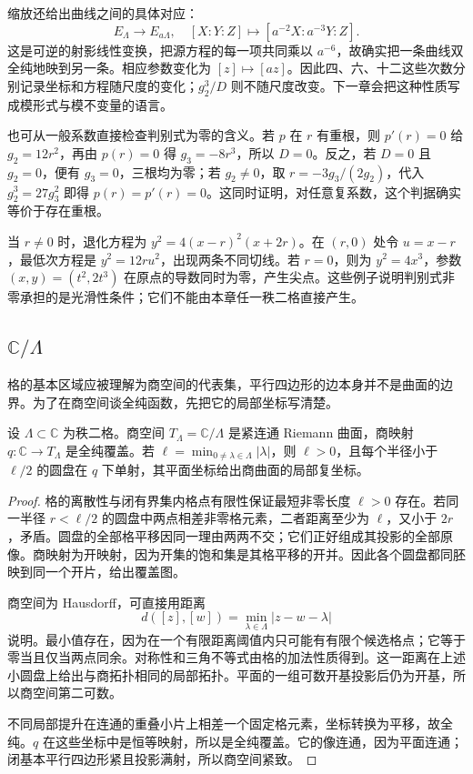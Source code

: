 \ProseParagraphBreak

缩放还给出曲线之间的具体对应：
\[
 E_\Lambda\longrightarrow E_{a\Lambda},\quad
 [X:Y:Z]\longmapsto[a^{-2}X:a^{-3}Y:Z].
\]
这是可逆的射影线性变换，把源方程的每一项共同乘以 \(a^{-6}\)，故确实把一条曲线双全纯地映到另一条。相应参数变化为 \([z]\mapsto[az]\)。因此四、六、十二这些次数分别记录坐标和方程随尺度的变化；\(g_2^3/D\) 则不随尺度改变。下一章会把这种性质写成模形式与模不变量的语言。

\ProseParagraphBreak

也可从一般系数直接检查判别式为零的含义。若 \(p\) 在 \(r\) 有重根，则 \(p'(r)=0\) 给 \(g_2=12r^2\)，再由 \(p(r)=0\) 得 \(g_3=-8r^3\)，所以 \(D=0\)。反之，若 \(D=0\) 且 \(g_2=0\)，便有 \(g_3=0\)，三根均为零；若 \(g_2\ne0\)，取 \(r=-3g_3/(2g_2)\)，代入 \(g_2^3=27g_3^2\) 即得 \(p(r)=p'(r)=0\)。这同时证明，对任意复系数，这个判据确实等价于存在重根。

\ProseParagraphBreak

当 \(r\ne0\) 时，退化方程为 \(y^2=4(x-r)^2(x+2r)\)。在 \((r,0)\) 处令 \(u=x-r\)，最低次方程是 \(y^2=12ru^2\)，出现两条不同切线。若 \(r=0\)，则为 \(y^2=4x^3\)，参数 \((x,y)=(t^2,2t^3)\) 在原点的导数同时为零，产生尖点。这些例子说明判别式非零承担的是光滑性条件；它们不能由本章任一秩二格直接产生。

\subsection{\texorpdfstring{\(\mathbb C/\Lambda\)}{C/\AnalysisPdfCapitalLambda}}
\label{b3:subsec:220403}

格的基本区域应被理解为商空间的代表集，平行四边形的边本身并不是曲面的边界。为了在商空间谈全纯函数，先把它的局部坐标写清楚。

\begin{proposition}[复环面的坐标与覆盖]\label{b3:prop:22-torus-charts}
设 \(\Lambda\subset\mathbb C\) 为秩二格。商空间 \(T_\Lambda=\mathbb C/\Lambda\) 是紧连通 Riemann 曲面，商映射 \(q:\mathbb C\to T_\Lambda\) 是全纯覆盖。若 \(\ell=\min_{0\ne\lambda\in\Lambda}|\lambda|\)，则 \(\ell>0\)，且每个半径小于 \(\ell/2\) 的圆盘在 \(q\) 下单射，其平面坐标给出商曲面的局部复坐标。
\end{proposition}
\begin{proof}
格的离散性与闭有界集内格点有限性保证最短非零长度 \(\ell>0\) 存在。若同一半径 \(r<\ell/2\) 的圆盘中两点相差非零格元素，二者距离至少为 \(\ell\)，又小于 \(2r\)，矛盾。圆盘的全部格平移因同一理由两两不交；它们正好组成其投影的全部原像。商映射为开映射，因为开集的饱和集是其格平移的开并。因此各个圆盘都同胚映到同一个开片，给出覆盖图。

商空间为 Hausdorff，可直接用距离
\[
 d([z],[w])=\min_{\lambda\in\Lambda}|z-w-\lambda|
\]
说明。最小值存在，因为在一个有限距离阈值内只可能有有限个候选格点；它等于零当且仅当两点同余。对称性和三角不等式由格的加法性质得到。这一距离在上述小圆盘上给出与商拓扑相同的局部拓扑。平面的一组可数开基投影后仍为开基，所以商空间第二可数。

不同局部提升在连通的重叠小片上相差一个固定格元素，坐标转换为平移，故全纯。\(q\) 在这些坐标中是恒等映射，所以是全纯覆盖。它的像连通，因为平面连通；闭基本平行四边形紧且投影满射，所以商空间紧致。
\end{proof}

